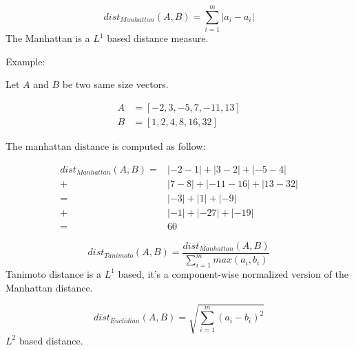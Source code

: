 \begin{definition}
  \begin{equation}
    dist_{Manhattan}(A, B) = \sum_{i=1}^{m} |a_i - a_i|
  \end{equation}
  The Manhattan is a $L^1$ based distance measure.

  Example:

  Let $A$ and $B$ be two same size vectors.

  \begin{equation*}
    \begin{aligned}
      A &= \left[-2, 3, -5, 7, -11, 13 \right] \\
      B &= \left[1, 2, 4, 8, 16, 32 \right]
    \end{aligned}
  \end{equation*}

  The manhattan distance is computed as follow:

  \begin{equation*}
    \begin{aligned}
      dist_{Manhattan}(A, B) =& |-2 - 1| + |3 - 2| + |-5 - 4| \\
                             +& |7 - 8| + |-11 - 16| + |13 - 32| \\
                             =& |-3| + |1| + |-9| \\
                             +& |-1| + |-27| + |-19| \\
                             =& 60
    \end{aligned}
  \end{equation*}
\end{definition}

\begin{definition}
  \begin{equation}
    dist_{Tanimoto}(A, B) = \frac{dist_{Manhattan}(A, B)}{\sum_{i=1}^{m} max(a_i, b_i)}
  \end{equation}
  Tanimoto distance is a $L^1$ based, it's a component-wise normalized version of the Manhattan distance.
\end{definition}

\begin{definition}
  \begin{equation}
    dist_{Euclidian}(A, B) = \sqrt{\sum_{i=1}^{m}(a_i - b_i)^2}
  \end{equation}
  $L^2$ based distance.
\end{definition}

